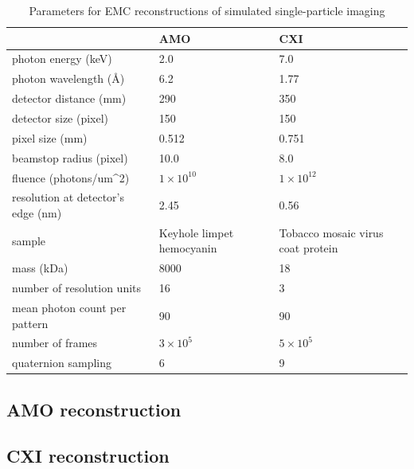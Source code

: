 \documentclass[]{iucr}              %
\begin{document}
\begin{table}
\caption{Parameters for EMC reconstructions of simulated single-particle imaging} \label{table:simParams}
\label{parameters}
\begin{tabular}{p{3.5cm} p{2.25cm} p{2.25cm}}
                                  			& AMO     						& CXI\\
\hline
photon energy (keV)    			& 2.0      						& 7.0 \\
photon wavelength (\AA)    		& 6.2      						& 1.77 \\
detector distance (mm)  			& 290    						& 350 \\
detector size (pixel)        			& 150    						& 150 \\
pixel size (mm)              			& 0.512  						& 0.751 \\
beamstop radius (pixel)  			& 10.0   						& 8.0 \\
fluence (photons/um^2) 			& $1 \times 10^{10}$  			& $1 \times 10^{12}$  \\
resolution at detector's edge (nm)  	& 2.45    						& 0.56 \\
\hline
sample 						& Keyhole limpet hemocyanin  		& Tobacco mosaic virus coat protein\\
mass (kDa) 					& 8000  						& 18 \\
number of resolution units                 & 16      						& 3 \\
mean photon count per pattern        	& 90     						& 90 \\
number of frames           			& $3\times10^5$    				& $5\times10^5$ \\
quaternion sampling        			& 6         						& 9 \\

\end{tabular}
\end{table}

\subsection{AMO reconstruction}
\subsection{CXI reconstruction}
\end{document}
